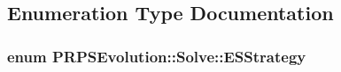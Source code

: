 \subsection{\-Enumeration \-Type \-Documentation}
\hypertarget{namespace_p_r_p_s_evolution_1_1_solve_abab6c89dae9caa790d8f2bcb1ef45685}{
\subsubsection[{\-E\-S\-Strategy}]{\setlength{\rightskip}{0pt plus 5cm}enum {\bf \-P\-R\-P\-S\-Evolution\-::\-Solve\-::\-E\-S\-Strategy}}}\label{namespace_p_r_p_s_evolution_1_1_solve_abab6c89dae9caa790d8f2bcb1ef45685}
